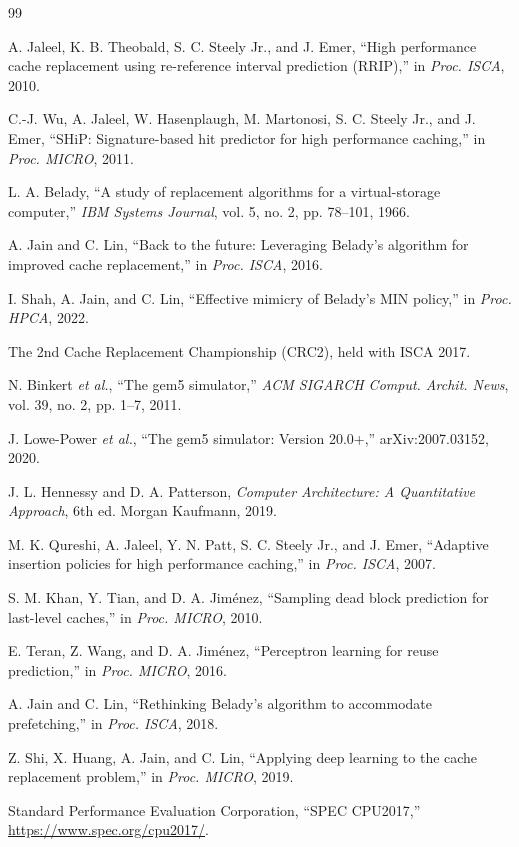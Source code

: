 \documentclass[11pt,conference]{IEEEtran}
\begin{document}
\begin{thebibliography}{99}

A. Jaleel, K. B. Theobald, S. C. Steely Jr., and J. Emer, ``High performance
cache replacement using re-reference interval prediction (RRIP),'' in
\emph{Proc. ISCA}, 2010.

C.-J. Wu, A. Jaleel, W. Hasenplaugh, M. Martonosi, S. C. Steely Jr., and
J. Emer, ``SHiP: Signature-based hit predictor for high performance caching,''
in \emph{Proc. MICRO}, 2011.

L. A. Belady, ``A study of replacement algorithms for a virtual-storage
computer,'' \emph{IBM Systems Journal}, vol. 5, no. 2, pp. 78--101, 1966.

A. Jain and C. Lin, ``Back to the future: Leveraging Belady's algorithm for
improved cache replacement,'' in \emph{Proc. ISCA}, 2016.

I. Shah, A. Jain, and C. Lin, ``Effective mimicry of Belady's MIN policy,'' in
\emph{Proc. HPCA}, 2022.

The 2nd Cache Replacement Championship (CRC2), held with ISCA 2017.

N. Binkert \emph{et al.}, ``The gem5 simulator,'' \emph{ACM SIGARCH Comput.
Archit. News}, vol. 39, no. 2, pp. 1--7, 2011.

J. Lowe-Power \emph{et al.}, ``The gem5 simulator: Version 20.0+,''
arXiv:2007.03152, 2020.

J. L. Hennessy and D. A. Patterson, \emph{Computer Architecture: A Quantitative
Approach}, 6th ed. Morgan Kaufmann, 2019.

M. K. Qureshi, A. Jaleel, Y. N. Patt, S. C. Steely Jr., and J. Emer, ``Adaptive
insertion policies for high performance caching,'' in \emph{Proc. ISCA}, 2007.

S. M. Khan, Y. Tian, and D. A. Jim\'enez, ``Sampling dead block prediction for
last-level caches,'' in \emph{Proc. MICRO}, 2010.

E. Teran, Z. Wang, and D. A. Jim\'enez, ``Perceptron learning for reuse
prediction,'' in \emph{Proc. MICRO}, 2016.

A. Jain and C. Lin, ``Rethinking Belady's algorithm to accommodate
prefetching,'' in \emph{Proc. ISCA}, 2018.

Z. Shi, X. Huang, A. Jain, and C. Lin, ``Applying deep learning to the cache
replacement problem,'' in \emph{Proc. MICRO}, 2019.

Standard Performance Evaluation Corporation, ``SPEC CPU2017,''
\url{https://www.spec.org/cpu2017/}.

\end{thebibliography}
\end{document}
